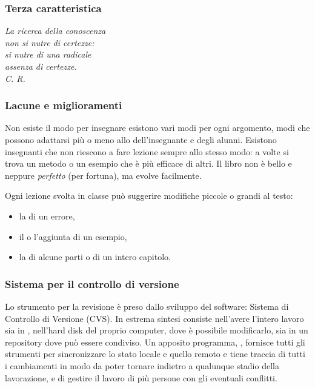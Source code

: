 \documentclass{beamer} %
\begin{document}
\begin{frame}\frametitle{Terza caratteristica}

\begin{center}  \end{center}

\vspace{20mm}
\begin{flushright}
\emph{La ricerca della conoscenza \\
non si nutre di certezze:\\
si nutre di una radicale\\
assenza di certezze.\\
C. R.}
\end{flushright}

\end{frame}


\begin{frame}\frametitle{Lacune e miglioramenti}

Non esiste il modo  per insegnare
esistono vari modi per ogni argomento, 
modi che possono adattarsi più o meno allo  
dell'insegnante e degli alunni. 
\spause
Esistono insegnanti che non riescono a fare lezione sempre allo stesso 
modo: a volte si trova un metodo o un esempio che è più efficace di altri.
\spause
Il libro non è bello e neppure \emph{perfetto} (per fortuna), 
ma evolve facilmente.

\pause
Ogni lezione svolta in classe può suggerire modifiche piccole o grandi al 
testo: 
\begin{itemize}
\item la  di un errore, 
\item il  o l'aggiunta di un esempio, 
\item la  di alcune parti o di un intero capitolo.
\end{itemize}



\end{frame}


\begin{frame}\frametitle{Sistema per il controllo di versione}

Lo strumento per la revisione è preso dallo sviluppo del software: 
Sistema di Controllo di Versione (CVS).
\spause
In estrema sintesi consiste nell'avere l'intero lavoro sia in , 
nell'hard disk del proprio computer, dove è possibile modificarlo, sia 
in un repository  dove può essere condiviso. 
\spause
Un apposito programma, , fornisce tutti gli strumenti per 
sincronizzare lo stato locale e quello remoto e tiene traccia di tutti 
i cambiamenti in modo da poter tornare indietro a qualunque stadio della 
lavorazione, e di gestire il lavoro di più persone con gli eventuali 
conflitti.

\end{frame}
\end{document}
